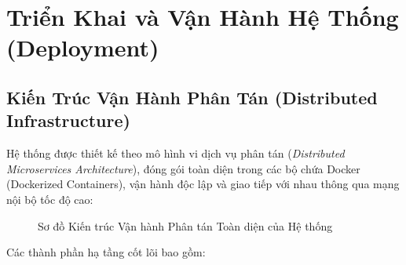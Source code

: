 
\chapter{Triển Khai và Vận Hành Hệ Thống (Deployment)}
\label{chap:deployment}

\section{Kiến Trúc Vận Hành Phân Tán (Distributed Infrastructure)}

Hệ thống được thiết kế theo mô hình vi dịch vụ phân tán (\textit{Distributed Microservices Architecture}), đóng gói toàn diện trong các bộ chứa Docker (Dockerized Containers), vận hành độc lập và giao tiếp với nhau thông qua mạng nội bộ tốc độ cao:

\begin{figure}[htbp]
  \centering
  \DrawSystemArchitecture
  \caption{Sơ đồ Kiến trúc Vận hành Phân tán Toàn diện của Hệ thống}
  \label{fig:system_architecture}
\end{figure}

Các thành phần hạ tầng cốt lõi bao gồm:


